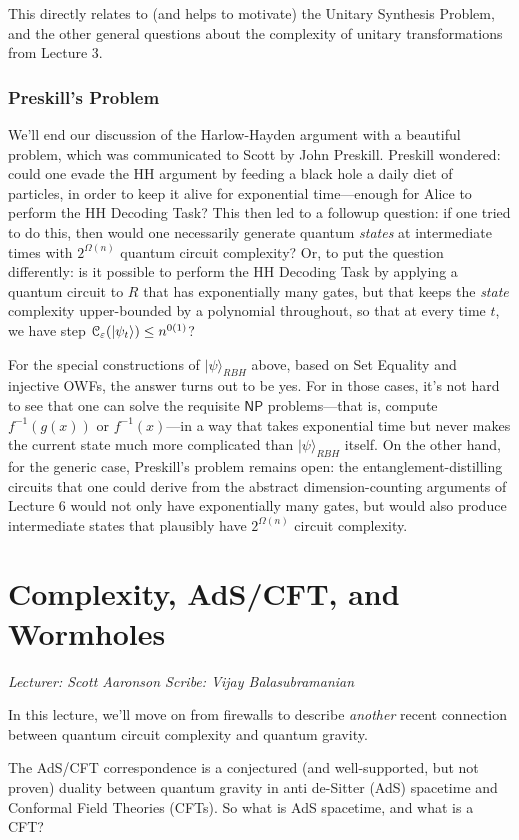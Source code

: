 \documentclass[12pt]{report}
\theoremstyle{plain}
\theoremstyle{definition}
\newcommand{\eps}{\varepsilon}
\renewcommand{\ket}[1]{|#1\rangle}
\newcommand{\lecture}[3]{%
  \chapter{#3}%
  \vspace{-5ex}%
  \textit{Lecturer: #1 \hfill Scribe: #2}\par%
  \vspace{1ex}\titlerule\vspace{2ex}}
\begin{document}
This directly relates to (and helps to motivate) the Unitary Synthesis Problem, and the other general questions about the complexity of unitary transformations from Lecture 3.

\subsection{Preskill's Problem}

We'll end our discussion of the Harlow-Hayden argument with a beautiful problem, which was communicated to Scott by John Preskill.  Preskill wondered: could one evade the HH argument by feeding a black hole a daily diet of particles, in order to keep it alive for exponential time---enough for Alice to perform the HH Decoding Task?  This then led to a followup question: if one tried to do this, then would one necessarily generate quantum {\em states} at intermediate times with $2^{\Omega(n)}$ quantum circuit complexity?  Or, to put the question differently: is it possible to perform the HH Decoding Task by applying a quantum circuit to $R$ that has exponentially many gates, but that keeps the {\em state} complexity upper-bounded by a polynomial throughout, so that at every time $t$, we have step $ {\cal C}_{{\eps}}(\ket{\psi_t}) \leq n^{0(1)}$?

For the special constructions of $\ket{\psi}_{RBH}$ above, based on Set Equality and injective OWFs, the answer turns out to be yes. For in those cases, it's not hard to see that one can solve the requisite $\mathsf{NP}$ problems---that is, compute $f^{-1}(g(x))$ or $f^{-1}(x)$---in a way that takes exponential time but never makes the current state much more complicated than $\ket{\psi}_{RBH}$ itself.  On the other hand, for the generic case, Preskill's problem remains open: the entanglement-distilling circuits that one could derive from the abstract dimension-counting arguments of Lecture 6 would not only have exponentially many gates, but would also produce intermediate states that plausibly have $2^{\Omega(n)}$ circuit complexity.



\lecture{Scott Aaronson}{Vijay Balasubramanian}{Complexity, AdS/CFT, and Wormholes}

In this lecture, we'll move on from firewalls to describe {\em another} recent connection between quantum circuit complexity and quantum gravity.

The AdS/CFT correspondence is a conjectured (and well-supported, but not proven) duality between quantum gravity in anti de-Sitter (AdS) spacetime  and Conformal Field Theories (CFTs). So what is AdS spacetime, and what is  a CFT?
\end{document}
